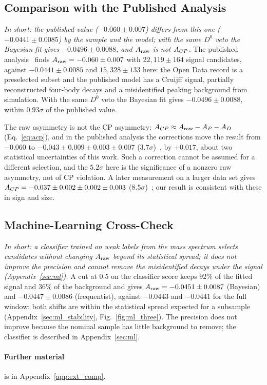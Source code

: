 \subsection{Comparison with the Published Analysis}
\label{sec:comparison_published}
\emph{In short: the published value ($-0.060\pm0.007$) differs from this one ($-0.0441\pm0.0085$) by the sample and the model; with the same $D^0$ veto the Bayesian fit gives $-0.0496\pm0.0088$, and $A_{\mathrm{raw}}$ is not $A_{CP}$.}
The published analysis~\cite{lhcb_cpv_2013} finds $A_{\mathrm{raw}}=-0.060\pm0.007$ with $22{,}119\pm164$ signal candidates, against $-0.0441\pm0.0085$ and $15{,}328\pm133$ here: the Open Data record is a preselected subset and the published model has a Cruijff signal, partially reconstructed four-body decays and a misidentified peaking background from simulation. With the same $D^0$ veto the Bayesian fit gives $-0.0496\pm0.0088$, within $0.93\sigma$ of the published value.

The raw asymmetry is not the CP asymmetry: $A_{CP}\approx A_{\mathrm{raw}}-A_P-A_D$ (Eq.~\eqref{eq:acp}), and in the published analysis the corrections move the result from $-0.060$ to $-0.043\pm0.009\pm0.003\pm0.007$ ($3.7\sigma$)~\cite{lhcb_cpv_2013}, by $+0.017$, about two statistical uncertainties of this work. Such a correction cannot be assumed for a different selection, and the $5.2\sigma$ here is the significance of a nonzero raw asymmetry, not of CP violation. A later measurement on a larger data set gives $A_{CP}=-0.037\pm0.002\pm0.002\pm0.003$ ($8.5\sigma$)~\cite{lhcb_cpv_prd2023,lhcb_cpv_paper}; our result is consistent with these in sign and size.

\subsection{Machine-Learning Cross-Check}
\label{sec:comparison_mlcheck}
\emph{In short: a classifier trained on weak labels from the mass spectrum selects candidates without changing $A_{\mathrm{raw}}$ beyond its statistical spread; it does not improve the precision and cannot remove the misidentified decays under the signal (Appendix~\ref{sec:ml}).}
A cut at $0.5$ on the classifier score keeps $92\%$ of the fitted signal and $36\%$ of the background and gives $A_{\mathrm{raw}}=-0.0451\pm0.0087$ (Bayesian) and $-0.0447\pm0.0086$ (frequentist), against $-0.0443$ and $-0.0441$ for the full window: both shifts are within the statistical spread expected for a subsample (Appendix~\ref{sec:ml_stability}, Fig.~\ref{fig:ml_three}). The precision does not improve because the nominal sample has little background to remove; the classifier is described in Appendix~\ref{sec:ml}.

\paragraph*{Further material} is in Appendix~\ref{app:ext_comp}.
